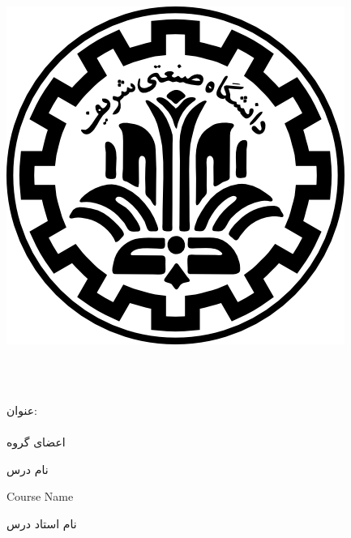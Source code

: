 
\begin{center}

\includegraphics[scale=0.2]{front/template/images/logo.png}

\vspace{-0.2cm}
\University \\[-0.3em]
\Department\\


\begin{large}
\vspace{0.5cm}



\end{large}

\vspace{1.5cm}

{عنوان:}\\[1.2em]
{\LARGE\textbf{\CourseReportTitle}}\\ 

\vspace{1cm}
{اعضای گروه}\\[.5em]
{\large\textbf{\GroupeMembers}}

\vspace{0.7cm}

{نام درس}\\[.5em]
{\large\textbf{\CourseName}}
\vspace{0.7cm}

\begin{latin}
{Course Name}\\
{\Large\textbf\EnglishCourseTitle}
\end{latin}

\vspace{0.8cm}

{\large\textbf{\courseSemester}}

{نام استاد درس}\\[.5em]
{\large\textbf{\CourseProfessor}}

\vspace{1.2cm}

\end{center}

\newpage
